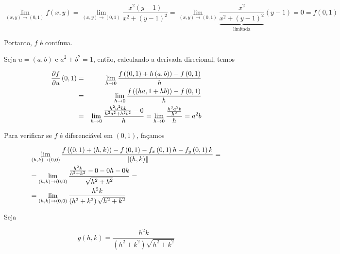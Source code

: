 \documentclass{book}
\begin{document}
\begin{sol}
\[
\scriptstyle{
\mathop {\lim }\limits_{\left( {x,y} \right) \to \left( {0,1} \right)} f\left( {x,y} \right) = \mathop {\lim }\limits_{\left( {x,y} \right) \to \left( {0,1} \right)} \frac{{x^2 \left( {y - 1} \right)}}
{{x^2  + \left( {y - 1} \right)^2 }} = \mathop {\lim }\limits_{\left( {x,y} \right) \to \left( {0,1} \right)} \underbrace {\scriptstyle{\frac{x^2}{x^2  + \left( {y - 1} \right)^2}}}_{{\text{limitada}}}\left( {y - 1} \right) = 0 = f\left( {0,1} \right)
}
\]

Portanto, $f$ \'e cont\'inua.

Seja $u=(a,b)$ e $a^2+b^2=1$, ent\~ao, calculando a derivada direcional, temos


\begin{eqnarray*}
  \frac{{\partial f}}{{\partial u}}\left( {0,1} \right) &=& \mathop {\lim }\limits_{h \to 0} \frac{{f\left( {\left( {0,1} \right) + h\left( {a,b} \right)} \right) - f\left( {0,1} \right)}}{h} \hfill \\
   &=& \mathop {\lim }\limits_{h \to 0} \frac{{f\left( {\left( {ha,1 + hb} \right)} \right) - f\left( {0,1} \right)}}{h} \hfill \\
   &=& \mathop {\lim }\limits_{h \to 0} \frac{{\frac{{h^2 a^2 hb}}{{h^2 a^2  + h^2 b^2 }} - 0}}{h} = \mathop {\lim }\limits_{h \to 0} \frac{{\frac{{h^3 a^2 b}}{{h^2 }}}}{h} = a^2 b \hfill \\
\end{eqnarray*}

Para verificar se $f$ \'e diferenci\'avel em $(0,1)$, fa\c{c}amos

\[
\begin{gathered}
  \mathop {\lim }\limits_{\left( {h,k} \right) \to \left( {0,0} \right)} \frac{{f\left( {\left( {0,1} \right) + \left( {h,k} \right)} \right) - f\left( {0,1} \right) - f_x \left( {0,1} \right)h - f_y \left( {0,1} \right)k}}
{{\left\| {\left( {h,k} \right)} \right\|}} =  \hfill \\
   = \mathop {\lim }\limits_{\left( {h,k} \right) \to \left( {0,0} \right)} \frac{{\frac{{h^2 k}}
{{h^2  + k^2 }} - 0 - 0h - 0k}}
{{\sqrt {h^2  + k^2 } }} =  \hfill \\
   = \mathop {\lim }\limits_{\left( {h,k} \right) \to \left( {0,0} \right)} \frac{{h^2 k}}
{{\left( {h^2  + k^2 } \right)\sqrt {h^2  + k^2 } }} \hfill \\
\end{gathered}
\]

Seja

\[
g\left( {h,k} \right) = \frac{{h^2 k}}
{{\left( {h^2  + k^2 } \right)\sqrt {h^2  + k^2 } }}
\]


\end{sol}
\end{document}
